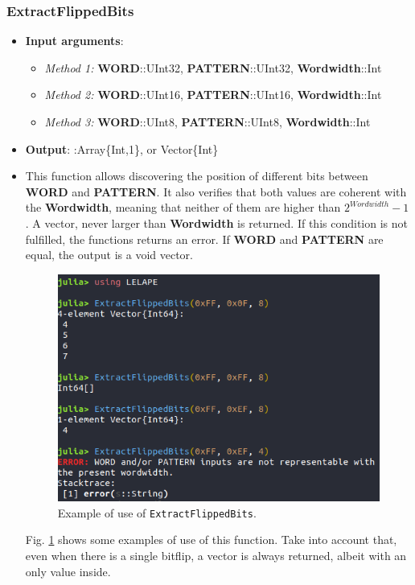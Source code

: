  \subsubsection*{ExtractFlippedBits}\label{Func:ExtractFlippedBits}
 \begin {itemize}
 \item \textbf{Input arguments}:
 \begin{itemize}
 	\item \textit{Method 1: }\textbf{WORD}::UInt32, \textbf{PATTERN}::UInt32, \textbf{Wordwidth}::Int
 	\item \textit{Method 2: }\textbf{WORD}::UInt16, \textbf{PATTERN}::UInt16, \textbf{Wordwidth}::Int
 	\item \textit{Method 3: }\textbf{WORD}::UInt8, \textbf{PATTERN}::UInt8, \textbf{Wordwidth}::Int
 \end{itemize}
 \item \textbf{Output}: :Array\{Int,1\}, or Vector\{Int\}
 \item This function allows discovering the position of different bits between \textbf{WORD}
 and \textbf{PATTERN}. It also verifies that both values are coherent with the \textbf{Wordwidth},
 meaning that neither of them are higher than \(2^{Wordwidth}-1\). A vector, never larger than \textbf{Wordwidth} is returned. If this condition is not fulfilled, the functions returns an error. If \textbf{WORD} and \textbf{PATTERN} are equal, the output is a void vector.
 \begin{figure}[h!]
 	\centering
 	\includegraphics[width=0.65\columnwidth]{fig/functions/ExtractFlippedBits.png}
 	\caption{Example of use of \texttt{ExtractFlippedBits}.}
 	\label{fig:Example_ExtractFlippedBits}
 \end{figure}
 
 Fig. \ref{fig:Example_ExtractFlippedBits} shows some examples of use of this function. Take into account that, even when there is a single bitflip, a vector is always returned, albeit with an only value inside.
\end{itemize}
%
